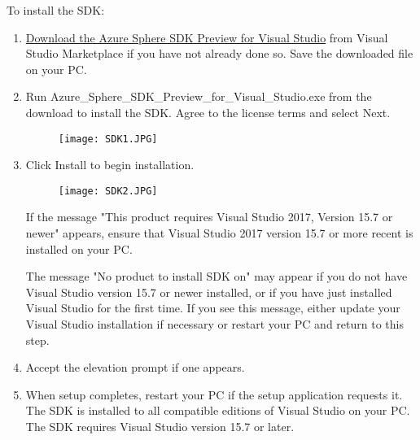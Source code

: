 To install the SDK:
\begin{enumerate}
    \item \hyperlink{https://aka.ms/AzureSphereSDKDownload}{Download the Azure Sphere SDK Preview for Visual Studio} from Visual Studio Marketplace if you have not already done so. Save the downloaded file on your PC.
    \item Run Azure\_Sphere\_SDK\_Preview\_for\_Visual\_Studio.exe from the download to install the SDK. Agree to the license terms and select Next.
    \begin{figure}[h]
    \texttt{[image: SDK1.JPG]}
    \end{figure}
    \newpage
    \item Click Install to begin installation.
    \begin{figure}[h]
    \texttt{[image: SDK2.JPG]}
    \end{figure}
    \newline
    If the message "This product requires Visual Studio 2017, Version 15.7 or newer" appears, ensure that Visual Studio 2017 version 15.7 or more recent is installed on your PC.

    The message "No product to install SDK on" may appear if you do not have Visual Studio version 15.7 or newer installed, or if you have just installed Visual Studio for the first time. If you see this message, either update your Visual Studio installation if necessary or restart your PC and return to this step.
    \item Accept the elevation prompt if one appears.
    \item When setup completes, restart your PC if the setup application requests it. The SDK is installed to all compatible editions of Visual Studio on your PC. The SDK requires Visual Studio version 15.7 or later.
    
\end{enumerate}

